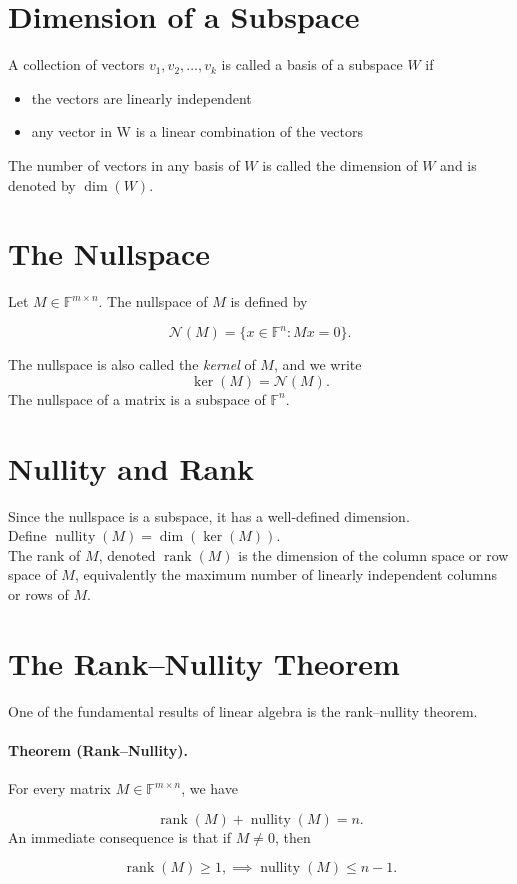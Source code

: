 \section{Dimension of a Subspace}
\label{dimension}
A collection of vectors $v_1,v_2,\dots,v_k$ is called a basis of a subspace \(W\) if

\begin{itemize}
\item the vectors are linearly independent
\item any vector in W is a linear combination of the vectors
\end{itemize}

The number of vectors in any basis of \(W\) is called the dimension of \(W\)
and is denoted by $\dim(W)$.

\section{The Nullspace}
\label{nullspace}
Let $M\in\mathbb F^{m\times n}$.
The nullspace of \(M\) is defined by

\[
\mathcal N(M)
=
\{x\in\mathbb F^n : Mx=0\}.
\]

\vspace{0.4em}
\noindent The nullspace is also called the \emph{kernel} of \(M\), and we write
\[
\ker(M)=\mathcal N(M).
\]
\noindent The nullspace of a matrix is a subspace of \(\mathbb F^n\).


\section{Nullity and Rank}
\label{nullity_and_rank}
Since the nullspace is a subspace, it has a well-defined dimension.\\


\noindent Define $\operatorname{nullity}(M)=\dim(\ker(M))$.\\


\noindent The rank of \(M\), denoted $\operatorname{rank}(M)$ is the dimension of the 
column space or row space of \(M\), equivalently the maximum number
of linearly independent columns or rows of \(M\).
\section{The Rank--Nullity Theorem}
\label{rank_nullity}
One of the fundamental results of linear algebra is the rank--nullity theorem.

\paragraph{Theorem (Rank--Nullity).}
For every matrix $M\in\mathbb F^{m\times n}$, we have

\[
\operatorname{rank}(M)
+
\operatorname{nullity}(M)
=
n.
\]
\vspace{0.4em}
An immediate consequence is that if \(M\neq0\), then

\[
\operatorname{rank}(M)\ge1,
\implies
\operatorname{nullity}(M)\le n-1.
\]



